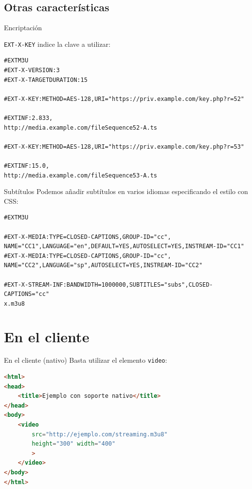 \documentclass[10pt,compress,usetitleprogressbar,mathserif]{beamer}
\begin{document}
\subsection{Otras características}

\begin{frame}[fragile]{Encriptación} %

\texttt{EXT-X-KEY} indice la clave a utilizar:

\begin{lstlisting}
#EXTM3U
#EXT-X-VERSION:3
#EXT-X-TARGETDURATION:15

#EXT-X-KEY:METHOD=AES-128,URI="https://priv.example.com/key.php?r=52"

#EXTINF:2.833,
http://media.example.com/fileSequence52-A.ts

#EXT-X-KEY:METHOD=AES-128,URI="https://priv.example.com/key.php?r=53"

#EXTINF:15.0,
http://media.example.com/fileSequence53-A.ts
\end{lstlisting}
\end{frame}

\begin{frame}[fragile]{Subtítulos}
Podemos añadir subtítulos en varios idiomas especificando el estilo con CSS:

\begin{lstlisting}
#EXTM3U

#EXT-X-MEDIA:TYPE=CLOSED-CAPTIONS,GROUP-ID="cc",
NAME="CC1",LANGUAGE="en",DEFAULT=YES,AUTOSELECT=YES,INSTREAM-ID="CC1"
#EXT-X-MEDIA:TYPE=CLOSED-CAPTIONS,GROUP-ID="cc",
NAME="CC2",LANGUAGE="sp",AUTOSELECT=YES,INSTREAM-ID="CC2"

#EXT-X-STREAM-INF:BANDWIDTH=1000000,SUBTITLES="subs",CLOSED-CAPTIONS="cc"
x.m3u8
\end{lstlisting}
\end{frame}

\section{En el cliente}

\begin{frame}[fragile]{En el cliente (nativo)}
  Basta utilizar el elemento \texttt{video}:

\begin{lstlisting}[language=HTML]
<html>
<head>
    <title>Ejemplo con soporte nativo</title>
</head>
<body>
    <video
        src="http://ejemplo.com/streaming.m3u8"
        height="300" width="400"
        >
    </video>
</body>
</html>
\end{lstlisting}
\end{frame}
\end{document}
